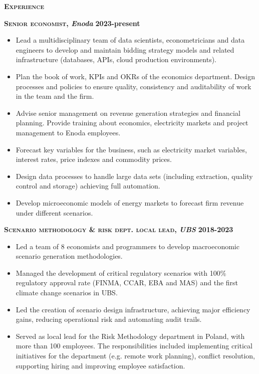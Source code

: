 \documentclass[11pt, a4paper]{article}
\newcommand{\dates}[1]{\hfill\mbox{\textbf{#1}}} %
\newcommand{\headright}[1]{\vspace*{2.5ex}\textsc{\Large\color{cvblue}#1}\par
     \vspace*{-2ex}{\color{cvblue}\hrulefill}\par}
\newcommand{\titlejob}[3]{ %
		\textbf{\textsc{#1}, \textit{#2}} \dates{#3}\\}
\begin{document}
\begin{minipage}[t]{0.56\textwidth}
\setlength{\parskip}{0.8ex}%

\vspace{2ex}

\headright{\textbf{Experience}}
\small

\titlejob{Senior economist}{Enoda}{2023-present}
\begin{itemize}
	\vspace*{-\baselineskip}
	\item Lead a multidisciplinary team of data scientists, econometricians and data engineers to develop and maintain bidding strategy models and related infrastructure (databases, APIs, cloud production environments). 
	\item Plan the book of work, KPIs and OKRs of the economics department. Design processes and policies to ensure quality, consistency and auditability of work in the team and the firm. 
	\item Advise senior management on revenue generation strategies and financial planning. Provide training about economics, electricity markets and project management to Enoda employees. 
	\item Forecast key variables for the business, such as electricity market variables, interest rates, price indexes and commodity prices. 
	\item Design data processes to handle large data sets (including extraction, quality control and storage) achieving full automation. 
	\item Develop microeconomic models of energy markets to forecast firm revenue under different scenarios.
\end{itemize}

\titlejob{Scenario methodology \& risk dept. local lead}{UBS}{2018-2023}
\small{
\begin{itemize}
	\vspace*{-\baselineskip}
	\item Led a team of 8 economists and programmers to develop macroeconomic scenario generation methodologies. 
	\item Managed the development of critical regulatory scenarios with 100\% regulatory approval rate (FINMA, CCAR, EBA and MAS) and the first climate change scenarios in UBS. 
	\item Led the creation of scenario design infrastructure, achieving major efficiency gains, reducing operational risk and automating audit trails. 
	\item Served as local lead for the Risk Methodology department in Poland, with more than 100 employees. The responsibilities included implementing critical initiatives for the department (e.g. remote work planning), conflict resolution, supporting hiring and improving employee satisfaction.
\end{itemize}
}


\end{minipage}
\end{document}
